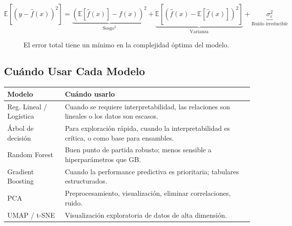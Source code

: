 \documentclass[12pt, a4paper]{article}
\newcommand{\E}{\mathbb{E}}
\begin{document}
\[
	\E\!\left[(y - \hat{f}(x))^2\right]
	= \underbrace{\left(\E[\hat{f}(x)] - f(x)\right)^2}_{\text{Sesgo}^2}
	+ \underbrace{\E\!\left[\left(\hat{f}(x) - \E[\hat{f}(x)]\right)^2\right]}_{\text{Varianza}}
	+ \underbrace{\sigma^2_\varepsilon}_{\text{Ruido irreducible}}
\]

\begin{figure}[H]
	\centering
	\caption{El error total tiene un mínimo en la complejidad óptima del modelo.}
\end{figure}

\subsection{Cuándo Usar Cada Modelo}

\begin{center}
	\begin{tabular}{p{3.5cm}p{9cm}}
		\toprule
		\textbf{Modelo}         & \textbf{Cuándo usarlo}                          \\
		\midrule
		Reg. Lineal / Logística &
		Cuando se requiere interpretabilidad, las relaciones son lineales
		o los datos son escasos.                                                  \\
		Árbol de decisión       &
		Para exploración rápida, cuando la interpretabilidad es crítica, o
		como base para ensambles.                                                 \\
		Random Forest           &
		Buen punto de partida robusto; menos sensible a hiperparámetros que GB.   \\
		Gradient Boosting       &
		Cuando la performance predictiva es prioritaria; tabulares estructurados. \\
		PCA                     &
		Preprocesamiento, visualización, eliminar correlaciones, ruido.           \\
		UMAP / t-SNE            &
		Visualización exploratoria de datos de alta dimensión.                    \\
		\bottomrule
	\end{tabular}
\end{center}
\end{document}
